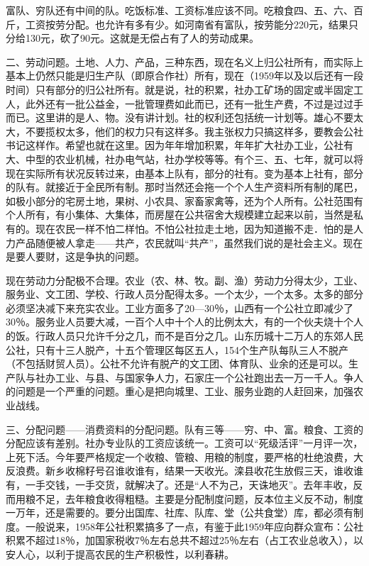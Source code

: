 富队、穷队还有中间的队。吃饭标准、工资标准应该不同。吃粮食四、五、六、百斤，工资按劳分配。也允许有多有少。如河南省有富队，按劳能分220元，结果只分给130元，砍了90元。这就是无偿占有了人的劳动成果。

二、劳动问题。土地、人力、产品，三种东西，现在名义上归公社所有，而实际上基本上仍然只能是归生产队（即原合作社）所有，现在（1959年以及以后还有一段时间）只有部分的归公社所有。就是说，社的积累，社办工矿场的固定或半固定工人，此外还有一批公益金，一批管理费如此而已，还有一批生产费，不过是过过手而已。这里讲的是人、物。没有讲计划。社的权利还包括统一计划等。雄心不要太大，不要揽权太多，他们的权力只有这样多。我主张权力只搞这样多，要教会公社书记这样作。希望也就在这里。因为年年增加积累，年年扩大社办工业，公社有大、中型的农业机械，社办电气站，社办学校等等。有个三、五、七年，就可以将现在实际所有状况反转过来，由基本上队有，部分的社有。变为基本上社有，部分的队有。就接近于全民所有制。那时当然还会拖一个个人生产资料所有制的尾巴，如极小部分的宅房土地，果树、小农具、家畜家禽等，还为个人所有。公社范围有个人所有，有小集体、大集体，而房屋在公共宿舍大规模建立起来以前，当然是私有的。现在农民一样不怕二样怕。不怕公社拉走土地，因为知道搬不走．怕的是人力产品随便被人拿走——共产，农民就叫“共产”，虽然我们说的是社会主义。现在是要人要财，这是争执的问题。

现在劳动力分配极不合理。农业（农、林、牧。副、渔）劳动力分得太少，工业、服务业、文工团、学校、行政人员分配得太多。一个太少，一个太多。太多的部分必须坚决减下来充实农业。工业方面多了20—30％，山西有一个公社立即减少了30％。服务业人员要大减，一百个人中十个人的比例太大，有的一个伙夫烧十个人的饭。行政人员只允许千分之几，而不是百分之几。山东历城十二万人的东郊人民公社，只有十三人脱产，十五个管理区每区五人，154个生产队每队三人不脱产（不包括财贸人员）。公社不允许有脱产的文工团、体育队、业余的还是可以。生产队与社办工业、与县、与国家争人力，石家庄一个公社跑出去一万一千人。争人的问题是一个严重的问题。重心是把向城里、工业、服务业跑的人赶回来，加强农业战线。

三、分配问题——消费资料的分配问题。队有三等——穷、中、富。粮食、工资的分配应该有差别。社办专业队的工资应该统一。工资可以“死级活评”一月评一次，上死下活。今年要严格规定一个收粮、管粮、用粮的制度，要严格的杜绝浪费，大反浪费。新乡收棉籽号召谁收谁有，结果一天收光。滦县收花生放假三天，谁收谁有，一手交钱，一手交货，就解决了。还是“人不为己，天诛地灭”。去年丰收，反而用粮不足，去年粮食收得粗糙。主要是分配制度问题，反本位主义反不动，制度一万年，还是需要的。要分出国库、社库、队库、堂（公共食堂）库，都必须有制度。一般说来，1958年公社积累搞多了一点，有鉴于此1959年应向群众宣布：公社积累不超过18％，加国家税收7％左右总共不超过25％左右（占工农业总收入），以安人心，以利于提高农民的生产积极性，以利春耕。


